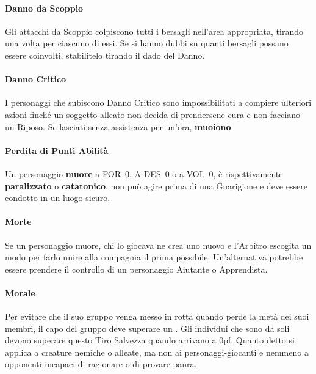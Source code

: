 \documentclass[itdr]{subfiles}
\begin{document}
\vfill
\paragraph{Danno da Scoppio}
Gli attacchi da Scoppio colpiscono tutti i bersagli nell’area appropriata, tirando una volta per ciascuno di essi. Se si hanno dubbi su quanti bersagli possano essere coinvolti, stabilitelo tirando il dado del Danno.

\vfill
\paragraph{Danno Critico}
I personaggi che subiscono Danno Critico sono impossibilitati a compiere ulteriori azioni finché un soggetto alleato non decida di prendersene cura e non facciano un Riposo. Se lasciati senza assistenza per un’ora, \textbf{muoiono}.

\vfill
\paragraph{Perdita di Punti Abilità}
Un personaggio \textbf{muore} a FOR~0. A DES~0 o a VOL~0, è rispettivamente \textbf{paralizzato} o \textbf{catatonico}, non può agire prima di una Guarigione e deve essere condotto in un luogo sicuro.

\vfill
\paragraph{Morte}
Se un personaggio muore, chi lo giocava ne crea uno nuovo e l’Arbitro escogita un modo per farlo unire alla compagnia il prima possibile. Un'alternativa potrebbe essere prendere il controllo di un personaggio Aiutante o Apprendista.

\vfill
\paragraph{Morale}
Per evitare che il suo gruppo venga messo in rotta quando perde la metà dei suoi membri, il capo del gruppo deve superare un . Gli individui che sono da soli devono superare questo Tiro Salvezza quando arrivano a 0pf. Quanto detto si applica a creature nemiche o alleate, ma non ai personaggi-giocanti e nemmeno a opponenti incapaci di ragionare o di provare paura.
\end{document}

